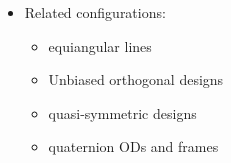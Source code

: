 \documentclass{beamer}
\begin{document}

  


\begin{frame}

  \begin{itemize}
  \item Related configurations:
    \begin{itemize}
    \item equiangular lines
    \item Unbiased orthogonal designs
    \item quasi-symmetric designs
    \item quaternion ODs and frames
    \end{itemize}
  \end{itemize}
  
\end{frame}
\end{document}
